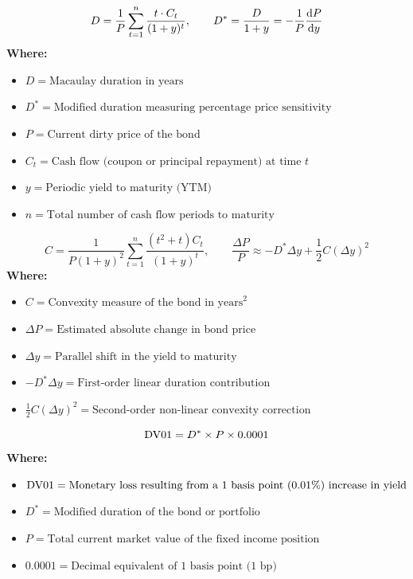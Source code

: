 \begin{formulabox}
\begin{equation}
D = \frac{1}{P} \sum_{t=1}^n \frac{t \cdot C_t}{(1 + y)^t}, \qquad D^* = \frac{D}{1 + y} = -\frac{1}{P} \frac{\mathrm{d} P}{\mathrm{d} y}
\end{equation}
\textbf{Where:}
\begin{itemize}[noitemsep, topsep=2pt]
    \item $D = \text{Macaulay duration in years}$
    \item $D^* = \text{Modified duration measuring percentage price sensitivity}$
    \item $P = \text{Current dirty price of the bond}$
    \item $C_t = \text{Cash flow (coupon or principal repayment) at time } t$
    \item $y = \text{Periodic yield to maturity (YTM)}$
    \item $n = \text{Total number of cash flow periods to maturity}$
\end{itemize}
\end{formulabox}

\begin{formulabox}
\begin{equation}
C = \frac{1}{P (1 + y)^2} \sum_{t=1}^n \frac{(t^2 + t) C_t}{(1 + y)^t}, \qquad \frac{\Delta P}{P} \approx -D^* \Delta y + \frac{1}{2} C (\Delta y)^2
\end{equation}
\textbf{Where:}
\begin{itemize}[noitemsep, topsep=2pt]
    \item $C = \text{Convexity measure of the bond in years}^2$
    \item $\Delta P = \text{Estimated absolute change in bond price}$
    \item $\Delta y = \text{Parallel shift in the yield to maturity}$
    \item $-D^* \Delta y = \text{First-order linear duration contribution}$
    \item $\frac{1}{2} C (\Delta y)^2 = \text{Second-order non-linear convexity correction}$
\end{itemize}
\end{formulabox}

\begin{formulabox}
\begin{equation}
\operatorname{DV01} = D^* \times P \times 0.0001
\end{equation}
\textbf{Where:}
\begin{itemize}[noitemsep, topsep=2pt]
    \item $\operatorname{DV01} = \text{Monetary loss resulting from a 1 basis point (0.01\%) increase in yield}$
    \item $D^* = \text{Modified duration of the bond or portfolio}$
    \item $P = \text{Total current market value of the fixed income position}$
    \item $0.0001 = \text{Decimal equivalent of 1 basis point (1 bp)}$
\end{itemize}
\end{formulabox}


